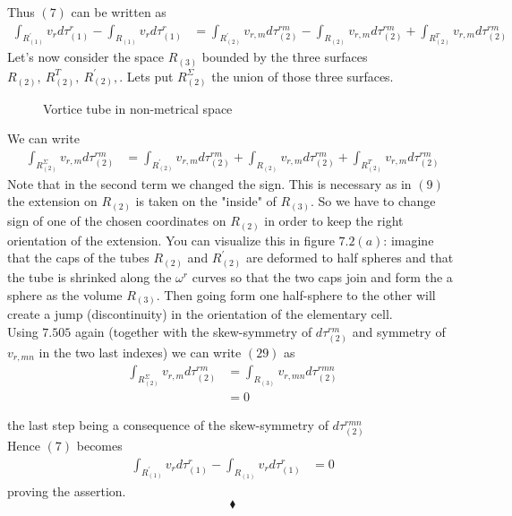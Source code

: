 Thus $(7)$ can be written as 
\begin{align}
\int_{R^{'}_{(1)}}v_r d\tau_{(1)}^r - \int_{R^{}_{(1)}}v_r d\tau_{(1)}^r &= \int_{R^{'}_{(2)}}v_{r,m}d\tau_{(2)}^{rm} - \int_{R^{}_{(2)}}v_{r,m}d\tau_{(2)}^{rm}+\int_{R^{T}_{(2)}}v_{r,m}d\tau_{(2)}^{rm} 
\end{align}
Let's now consider the space $R_{(3)}$ bounded by the three surfaces $R^{}_{(2)}, \ R^{T}_{(2)}, \ R^{'}_{(2)},$. Lets put $R^\Sigma_{(2)}$ the union of those three surfaces.\begin{figure}[H]%
    \centering
    \subfloat[]{}
\caption{Vortice tube in non-metrical space}
\label{fig:fig_p280b}
\end{figure}

We can write
\begin{align}
\int_{R^\Sigma_{(2)}}v_{r,m}d\tau_{(2)}^{rm}  &= \int_{R^{'}_{(2)}}v_{r,m}d\tau_{(2)}^{rm} + \int_{R^{}_{(2)}}v_{r,m}d\tau_{(2)}^{rm}+\int_{R^{T}_{(2)}}v_{r,m}d\tau_{(2)}^{rm} 
\end{align}
Note that in the second term we changed the sign. This is necessary as in $(9)$ the extension on $R^{}_{(2)}$ is taken on the "inside" of $ R_{(3)}$. So we have to change sign of one of the chosen coordinates on $R^{}_{(2)}$ in order to keep the right orientation of the extension. You can visualize this in figure $7.2(a)$: imagine that the caps of the tubes $R^{}_{(2)}$ and $R^{'}_{(2)}$ are deformed to half spheres and that the tube is  shrinked along the $\omega^r$ curves so that the two caps join and form the a sphere as the volume $R_{(3)}$. Then going form one half-sphere to the other will create a jump (discontinuity) in the orientation of the elementary cell.\\
Using $\mathbf{7.505}$ again (together with the skew-symmetry of $d\tau_{(2)}^{rm}$ and symmetry of $v_{r,mn}$ in the two last indexes) we can write $(29)$   as 
\begin{align}
\int_{R^\Sigma_{(2)}}v_{r,m}d\tau_{(2)}^{rm}  &= \int_{R^{}_{(3)}}v_{r,mn}d\tau_{(2)}^{rmn}\\
&=0
\end{align}

the last step being a consequence of the skew-symmetry of $d\tau_{(2)}^{rmn}$\\
Hence $(7)$ becomes 
\begin{align}
\int_{R^{'}_{(1)}}v_r d\tau_{(1)}^r - \int_{R^{}_{(1)}}v_r d\tau_{(1)}^r &= 0
\end{align}
proving the assertion.
$$\blacklozenge$$
\newpage


